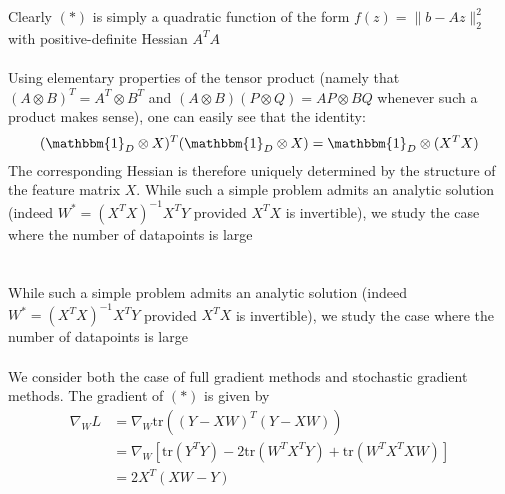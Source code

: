 \documentclass[12pt]{book}
\newcommand{\R}{\mathbb{R}}
\begin{document}
Clearly $(*)$ is simply a quadratic function of the form $f(z) = \|b - Az\|_2^2$ with positive-definite Hessian $A^{T}A$  \\ \\
Using elementary properties of the tensor product (namely that $(A \otimes B)^T = A^T \otimes  B^T$ and $(A \otimes B)(P \otimes Q) = AP \otimes BQ $ whenever such a product makes sense), one can easily see that the identity:
\[
	(\mathbbm{1} _{D} \otimes X)^T(\mathbbm{1} _D \otimes X) = \mathbbm{1} _D \otimes (X^TX)
\]
The corresponding Hessian is therefore uniquely determined by the structure of the feature matrix $X$. 
While such a simple problem admits an analytic solution (indeed $W^* = (X^{T}X)^{-1}X^{T}Y$ provided $X^{T}X$ is invertible), we study the case where the number of datapoints is large   
\\
\\
\\
While such a simple problem admits an analytic solution (indeed $W^* = (X^{T}X)^{-1}X^{T}Y$ provided $X^{T}X$ is invertible), we study the case where the number of datapoints is large   \\
\\
We consider both the case of full gradient methods and stochastic gradient methods. 
The gradient of $(*)$ is given by 
\begin{align*}
	\nabla_W L &= \nabla_W \text{tr}\left((Y - XW)^{T} (Y - XW)\right)\\
		   &= \nabla_W [\text{tr}(Y^TY)  - 2\text{tr}(W^{T}X^{T} Y) + \text{tr}(W^{T}X^{T}XW)]   \\
		   &= 2X^{T}(XW - Y)
\end{align*}
\end{document}
